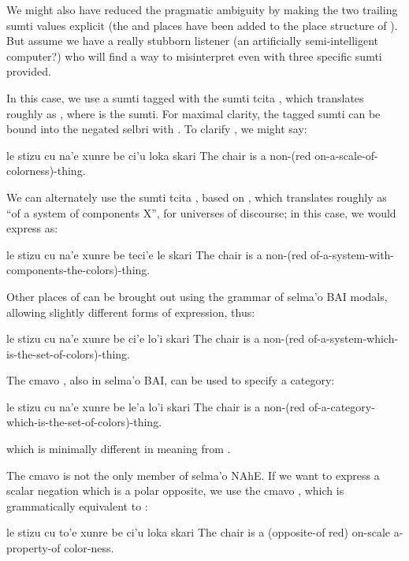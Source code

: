 We might also have reduced the pragmatic ambiguity by making
    the two trailing sumti values explicit (the 
    and  places have been added to the place
    structure of ). But assume we have a really stubborn
    listener (an artificially semi-intelligent computer?) who will
    find a way to misinterpret  even
    with three specific sumti provided.

In this case, we use a sumti tagged with the sumti tcita
    , which translates roughly as ,
    where  is the sumti. For maximal clarity, the tagged sumti
    can be bound into the negated selbri with . To clarify , we might say:
\begin{example}
le stizu cu na'e xunre be ci'u loka skari\n
The chair is a non-(red on-a-scale-of-colorness)-thing.
\end{example}

We can alternately use the sumti tcita , based on
    , which translates roughly as ``of a system of
    components X'', for universes of discourse; in this case, we
    would express  as:
\begin{example}
le stizu cu na'e xunre\n
\T	be teci'e le skari\n
The chair is a non-(red\n
\T	of-a-system-with-components-the-colors)-thing.
\end{example}

Other places of  can be brought out using the
    grammar of selma'o BAI modals, allowing slightly different
    forms of expression, thus:
\begin{example}
le stizu cu na'e xunre\n
\T	be ci'e lo'i skari\n
The chair is a non-(red\n
\T	of-a-system-which-is-the-set-of-colors)-thing.
\end{example}

The cmavo , also in selma'o BAI, can be used to
    specify a category:
\begin{example}
le stizu cu na'e xunre\n
\T	be le'a lo'i skari\n
The chair is a non-(red\n
\T	of-a-category-which-is-the-set-of-colors)-thing.
\end{example}

{\noindent}which is minimally different in meaning from . 

The cmavo  is not the only member of selma'o NAhE.
    If we want to express a scalar negation which is a polar
    opposite, we use the cmavo , which is grammatically
    equivalent to :
\begin{example}
le stizu cu to'e xunre\n
\T	be ci'u loka skari\n
The chair is a (opposite-of red)\n
\T	on-scale a-property-of color-ness.
\end{example}

